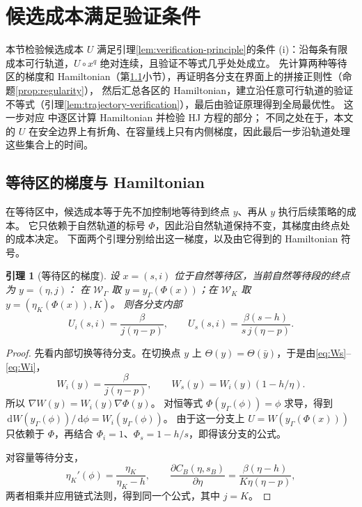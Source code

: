 \documentclass[11pt,a4paper,UTF8]{ctexart}
\newtheorem{lemma}[theorem]{引理}
\theoremstyle{definition}
\newcommand{\dd}{\,\mathrm d}
\begin{document}
\section{候选成本满足验证条件}
\label{sec:optimality}

本节检验候选成本 $U$ 满足引理\ref{lem:verification-principle}的条件 (i)：沿每条有限成本可行轨道，$U\circ x^q$ 绝对连续，且验证不等式几乎处处成立。
先计算两种等待区的梯度和 Hamiltonian（第\ref{sec:verification-details}小节），再证明各分支在界面上的拼接正则性（命题\ref{prop:regularity}），
然后汇总各区的 Hamiltonian，建立沿任意可行轨道的验证不等式（引理\ref{lem:trajectory-verification}），最后由验证原理得到全局最优性。
这一步对应 \citet[附录A.2]{MicloSpiroWeibull2022} 中逐区计算 Hamiltonian 并检验 HJ 方程的部分；
不同之处在于，本文的 $U$ 在安全边界上有折角、在容量线上只有内侧梯度，因此最后一步沿轨道处理这些集合上的时间。

\subsection{等待区的梯度与 Hamiltonian}
\label{sec:verification-details}
在等待区中，候选成本等于先不加控制地等待到终点 $y$、再从 $y$ 执行后续策略的成本。
它只依赖于自然轨道的标号 $\Phi$，因此沿自然轨道保持不变，其梯度由终点处的成本决定。
下面两个引理分别给出这一梯度，以及由它得到的 Hamiltonian 符号。

\begin{lemma}[等待区的梯度]
\label{lem:waiting-gradient}
设 $x=(s,i)$ 位于自然等待区，当前自然等待段的终点为 $y=(\eta,j)$：
在 $\mathcal W_\Gamma$ 取 $y=y_\Gamma(\Phi(x))$；在 $\mathcal W_K$ 取 $y=(\eta_K(\Phi(x)),K)$。
则各分支内部
\begin{equation}
U_i(s,i)=\frac{\beta}{j(\eta-p)},\qquad
U_s(s,i)=\frac{\beta(s-h)}{s\,j(\eta-p)}.
\label{eq:waiting-gradient}
\end{equation}
\end{lemma}
\begin{proof}
先看内部切换等待分支。在切换点 $y$ 上 $\Theta(y)=\Theta(\bar y)$，于是由\eqref{eq:Ws}--\eqref{eq:Wi}，
\[
W_i(y)=\frac \beta{j(\eta-p)},\qquad
W_s(y)=W_i(y)(1-h/\eta).
\]
所以 $\nabla W(y)=W_i(y)\nabla\Phi(y)$。
对恒等式 $\Phi(y_\Gamma(\phi))=\phi$ 求导，得到 $\dd W(y_\Gamma(\phi))/\dd\phi=W_i(y_\Gamma(\phi))$。
由于这一分支上 $U=W(y_\Gamma(\Phi(x)))$ 只依赖于 $\Phi$，再结合 $\Phi_i=1$、$\Phi_s=1-h/s$，即得该分支的公式。

对容量等待分支，
\[
\eta_K'(\phi)=\frac{\eta_K}{\eta_K-h},\qquad
\frac{\partial C_B(\eta,s_B)}{\partial\eta}
=\frac{\beta(\eta-h)}{K\eta(\eta-p)},
\]
两者相乘并应用链式法则，得到同一个公式，其中 $j=K$。
\end{proof}
\end{document}
